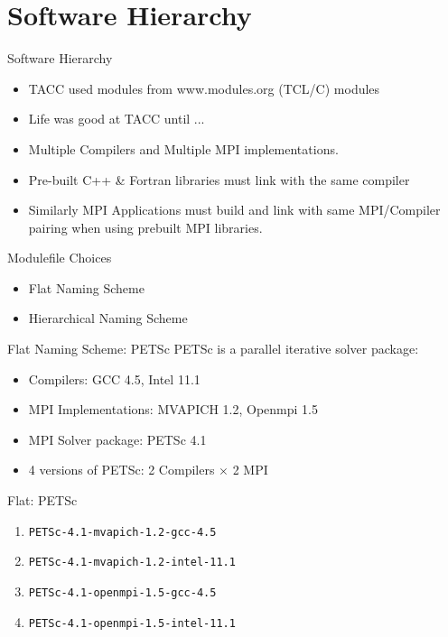 \documentclass{beamer}
\begin{document}
\section{Software Hierarchy}

\begin{frame}{Software Hierarchy}
  \begin{itemize}
    \item TACC used modules from www.modules.org (TCL/C) modules
    \item Life was good at TACC until ...
    \item Multiple Compilers and Multiple MPI implementations.
    \item Pre-built C++ \& Fortran libraries must link with the same compiler
    \item Similarly MPI Applications must build and link with same
      MPI/Compiler pairing when using prebuilt MPI libraries.
  \end{itemize}
\end{frame}

\begin{frame}{Modulefile Choices}
  \begin{itemize}
    \item Flat Naming Scheme
    \item Hierarchical Naming Scheme
  \end{itemize}
\end{frame}

\begin{frame}{Flat Naming Scheme: PETSc}
  PETSc is a parallel iterative solver package:
  \begin{itemize}
    \item Compilers: GCC 4.5, Intel 11.1
    \item MPI Implementations: MVAPICH 1.2, Openmpi 1.5
    \item MPI Solver package: PETSc 4.1
    \item 4 versions of PETSc: 2 Compilers $\times$ 2 MPI 
  \end{itemize}
\end{frame}

\begin{frame}{Flat: PETSc }
  \begin{enumerate}
  \item \texttt{PETSc-4.1-mvapich-1.2-gcc-4.5}
  \item \texttt{PETSc-4.1-mvapich-1.2-intel-11.1}
  \item \texttt{PETSc-4.1-openmpi-1.5-gcc-4.5}
  \item \texttt{PETSc-4.1-openmpi-1.5-intel-11.1}
  \end{enumerate}
\end{frame}
\end{document}
